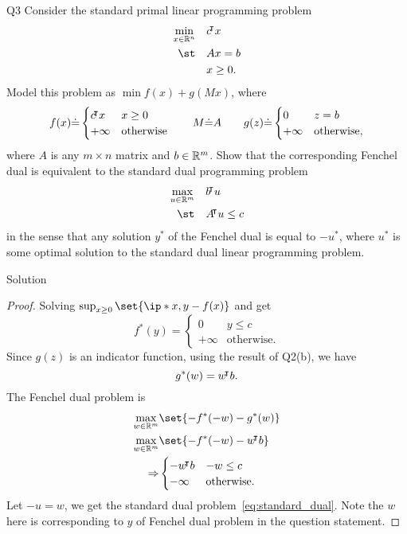 \documentclass{article}
\begin{document}
\begin{problem}
    {Q3}
    Consider the standard primal linear programming problem
    \begin{align*}
        \min_{x\in\R^n}\quad & c\trn x \\
        \st\quad & Ax=b \\
        & x\geq 0.
    \end{align*}
    Model this problem as $\min f(x)+g(Mx)$, where
    \[
    f(x)\dot{=}
    \begin{cases}
        c{}^{\mkern-4mu\intercal} x & x\geq 0\\
        +\infty & \text{otherwise}
    \end{cases}
    \qquad
    M\dot{=}A
    \qquad
    g(z)\dot{=}
    \begin{cases}
        0 & z=b\\
        +\infty & \text{otherwise},
    \end{cases}
    \]
    where $A$ is any $m\times n$ matrix and $b\in\mathbb{R}^m$. Show that the corresponding Fenchel dual is equivalent to the standard dual programming problem
    \begin{align}
        \label{eq:standard_dual}
        \begin{split}
            \max_{u\in\R^m}\quad & b\trn u \\
            \st\quad & A\trn u\leq c \\
        \end{split}
    \end{align}
    in the sense that any solution $y^*$ of the Fenchel dual is equal to $-u^*$, where $u^*$ is some optimal solution to the standard dual linear programming problem.
\end{problem}

\begin{solution}
    {Solution}
    \begin{proof}
        Solving $\sup_{x\geq 0}\set{\ip*{x, y}-f(x)}$ and get \[f^*(y)=\begin{cases}
            0 & y\leq c \\
            +\infty & \text{otherwise.}
        \end{cases}\]
        Since $g(z)$ is an indicator function, using the result of Q2(b), we have \[g^*(w)=w{}^{\mkern-4mu\intercal} b.\]
        The Fenchel dual problem is
        \begin{align*}
            \max_{w\in\R^m}&\set{-f^*(-w)-g^*(w)} \\
            \max_{w\in\R^m}&\set{-f^*(-w)-w\trn b} \\
            \Rightarrow&
            \begin{cases}
                -w\trn b & -w\leq c \\
                -\infty & \text{otherwise.}
            \end{cases}
        \end{align*}
        Let $-u=w$, we get the standard dual problem~\cref{eq:standard_dual}. Note the $w$ here is corresponding to $y$ of Fenchel dual problem in the question statement.
    \end{proof}
\end{solution}
\end{document}
